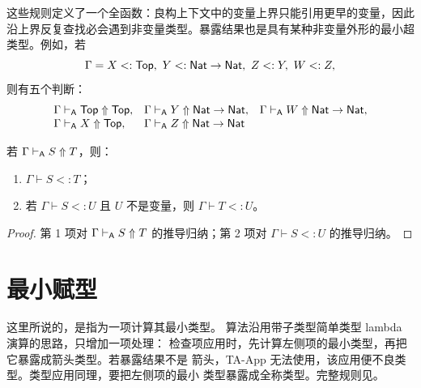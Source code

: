 这些规则定义了一个全函数：良构上下文中的变量上界只能引用更早的变量，因此
沿上界反复查找必会遇到非变量类型。暴露结果也是具有某种非变量外形的最小超
类型。例如，若
\[
\Gamma=X<:\mathsf{Top},\
Y<:\mathsf{Nat}\to\mathsf{Nat},\
Z<:Y,\ W<:Z,
\]
则有五个判断：
\[
\begin{array}{lll}
\Gamma\mathrel{\vdash_{\mathsf A}}\mathsf{Top}\Uparrow\mathsf{Top},&
\Gamma\mathrel{\vdash_{\mathsf A}} Y\Uparrow\mathsf{Nat}\to\mathsf{Nat},&
\Gamma\mathrel{\vdash_{\mathsf A}} W\Uparrow\mathsf{Nat}\to\mathsf{Nat},\\
\Gamma\mathrel{\vdash_{\mathsf A}} X\Uparrow\mathsf{Top},&
\Gamma\mathrel{\vdash_{\mathsf A}} Z\Uparrow\mathsf{Nat}\to\mathsf{Nat}
\end{array}
\]

\begin{lemma}[暴露]
\label{lem:28.1.1}
若 \(\Gamma\mathrel{\vdash_{\mathsf A}} S\Uparrow T\)，则：
\begin{enumerate}
  \item \(\Gamma\vdash S<:T\)；
  \item 若 \(\Gamma\vdash S<:U\) 且 \(U\) 不是变量，则
        \(\Gamma\vdash T<:U\)。
\end{enumerate}
\end{lemma}

\begin{proof}
第 1 项对 \(\Gamma\mathrel{\vdash_{\mathsf A}} S\Uparrow T\) 的推导归纳；第 2 项对
\(\Gamma\vdash S<:U\) 的推导归纳。
\end{proof}

\section{最小赋型}
\label{sec:28.2}

这里所说的，是指为一项计算其最小类型。
算法沿用带子类型简单类型 lambda 演算的思路，只增加一项处理：
检查项应用时，先计算左侧项的最小类型，再把它暴露成箭头类型。若暴露结果不是
箭头，TA-App 无法使用，该应用便不良类型。类型应用同理，要把左侧项的最小
类型暴露成全称类型。完整规则见。

